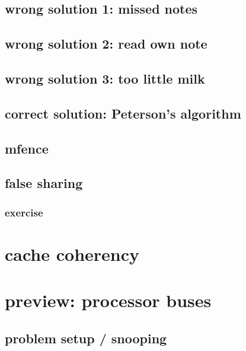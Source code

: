 \subsection{wrong solution 1: missed notes}


\subsection{wrong solution 2: read own note}


\subsection{wrong solution 3: too little milk}


\subsection{correct solution: Peterson's algorithm}


\subsection{mfence}


\subsection{false sharing}

\subsubsection{exercise}


\section{cache coherency}
\section{preview: processor buses}


\subsection{problem setup / snooping}

